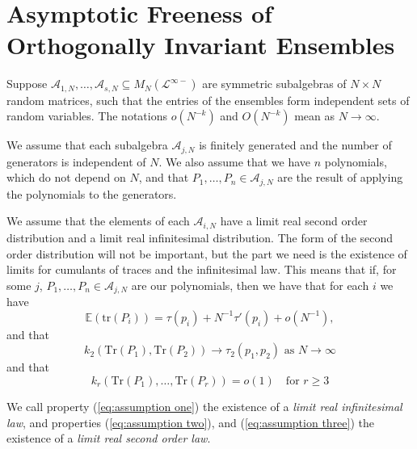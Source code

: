 \documentclass[11pt]{amsart}
\theoremstyle{definition}
\numberwithin{theorem}{section}
\newcommand{\cA}{\mathcal{A}}
\newcommand{\cL}{\mathcal{L}}
\newcommand{\sN}{{\scriptscriptstyle N}}
\newcommand{\rE} {\mathbb{E}}
\newcommand{\Tr}{\mathrm{Tr}}
\newcommand{\tr}{\mathrm{tr}}
\begin{document}

\section{Asymptotic Freeness of Orthogonally Invariant Ensembles}\label{sec:asymptotic freeness of orthogonally invariant matrices}


Suppose $\cA_{1, \sN}, \dots, \cA_{s, \sN} \subseteq
M_N(\cL^{\infty-})$ are symmetric subalgebras of $N \times
N$ random matrices, such that the entries of the ensembles
form independent sets of random variables. The notations
$o(N^{-k})$ and $O(N^{-k})$ mean as $N \to \infty$.

We assume that each subalgebra $\cA_{j, \sN}$ is finitely
generated and the number of generators is independent of
$N$. We also assume that we have $n$ polynomials, which do
not depend on $N$, and that $P_1, \dots, P_n \in \cA_{j,
  \sN}$ are the result of applying the polynomials to the
generators.

We assume that the elements of each $\cA_{i, \sN}$ have a
limit real second order distribution and a limit real
infinitesimal distribution. The form of the second order
distribution will not be important, but the part we need is
the existence of limits for cumulants of traces and the
infinitesimal law. This means that if, for some $j$, $P_1,
\dots, P_n \in \cA_{j, \sN}$ are our polynomials, then we
have that for each $i$ we have
\begin{equation}\label{eq:assumption one}
\rE(\tr(P_i)) = \tau(p_i) + N^{-1} \tau'(p_i) + o(N^{-1}),
\end{equation}
and that
\begin{equation}\label{eq:assumption two}
k_2(\Tr(P_1), \Tr(P_2)) \to \tau_2(p_1, p_2) \mbox{\ as\ } N \to \infty
\end{equation}
and that
\begin{equation}\label{eq:assumption three}
k_r(\Tr(P_1), \dots, \Tr(P_r)) = o(1) \quad\mbox{for\ } r \geq 3
\end{equation}

We call property (\ref{eq:assumption one}) the existence of
a \textit{limit real infinitesimal law}, and properties
(\ref{eq:assumption two}), and (\ref{eq:assumption three})
the existence of a \textit{limit real second order law}.
\end{document}
